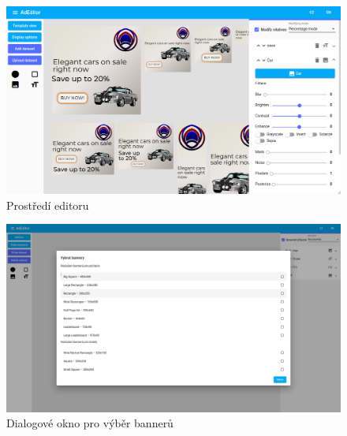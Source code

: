 \documentclass[czech,bachelor]{diploma}
\begin{document}
\begin{figure}[h]
    \includegraphics[width=1.0\textwidth]{Figures/editor/ad-editor.png}
    \caption{Prostředí editoru}
    \label{fig:editor:editor}
\end{figure}


\begin{figure}[h]
    \includegraphics[width=1.0\textwidth]{Figures/editor/bannery-dialog.png}
    \caption{Dialogové okno pro výběr bannerů}
    \label{fig:editor:banner-dialog}
\end{figure}
\end{document}
